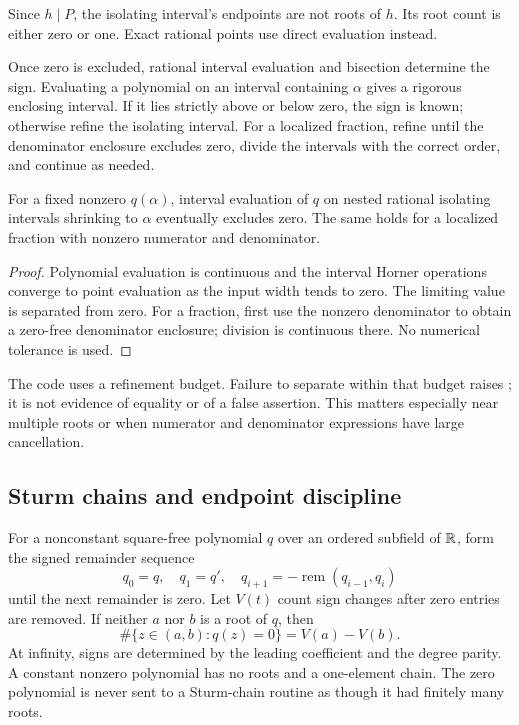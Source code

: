 Since $h\mid P$, the isolating interval's endpoints are not roots of $h$. Its root count is either zero or one. Exact rational points use direct evaluation instead.

Once zero is excluded, rational interval evaluation and bisection determine the sign. Evaluating a polynomial on an interval containing $\alpha$ gives a rigorous enclosing interval. If it lies strictly above or below zero, the sign is known; otherwise refine the isolating interval. For a localized fraction, refine until the denominator enclosure excludes zero, divide the intervals with the correct order, and continue as needed.

\begin{proposition}
For a fixed nonzero $q(\alpha)$, interval evaluation of $q$ on nested rational isolating intervals shrinking to $\alpha$ eventually excludes zero. The same holds for a localized fraction with nonzero numerator and denominator.
\end{proposition}
\begin{proof}
Polynomial evaluation is continuous and the interval Horner operations converge to point evaluation as the input width tends to zero. The limiting value is separated from zero. For a fraction, first use the nonzero denominator to obtain a zero-free denominator enclosure; division is continuous there. No numerical tolerance is used.
\end{proof}

The code uses a refinement budget. Failure to separate within that budget raises ; it is not evidence of equality or of a false assertion. This matters especially near multiple roots or when numerator and denominator expressions have large cancellation.

\subsection{Sturm chains and endpoint discipline}
For a nonconstant square-free polynomial $q$ over an ordered subfield of $\mathbb R$, form the signed remainder sequence
\[
 q_0=q,\quad q_1=q',\quad
 q_{i+1}=-\operatorname{rem}(q_{i-1},q_i)
\]
until the next remainder is zero. Let $V(t)$ count sign changes after zero entries are removed. If neither $a$ nor $b$ is a root of $q$, then
\[
 \#\{z\in(a,b):q(z)=0\}=V(a)-V(b).
\]
At infinity, signs are determined by the leading coefficient and the degree parity. A constant nonzero polynomial has no roots and a one-element chain. The zero polynomial is never sent to a Sturm-chain routine as though it had finitely many roots.

